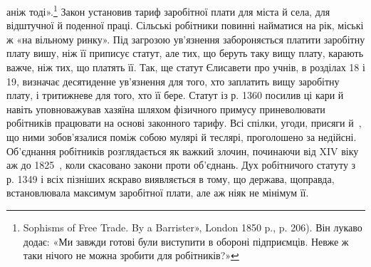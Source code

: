 \parcont{}  %
аніж тоді».\footnote{
Sophisms of Free Trade. By a Barrister», London 1850 p., p. 206).
Він лукаво додає: «Ми завжди готові були виступити в обороні підприємців.
Невже ж таки нічого не можна зробити для робітників?»
} Закон установив тариф заробітної плати для міста
й села, для відштучної й поденної праці. Сільські робітники
повинні найматися на рік, міські ж «на вільному ринку». Під
загрозою ув’язнення забороняється платити заробітну плату
вишу, ніж її приписує статут, але тих, що беруть таку вищу
плату, карають важче, ніж тих, що платять її. Так, ще статут
Єлисавети про учнів, в розділах 18 і 19, визначає десятиденне
ув’язнення для того, хто заплатить вищу заробітну плату, і
тритижневе для того, хто її бере. Статут із р. 1360 посилив ці
кари й навіть уповноважував хазяїна шляхом фізичного примусу
приневолювати робітників працювати на основі законного тарифу.
Всі спілки, угоди, присяги й~, що ними зобов’язалися поміж
собою мулярі й теслярі, проголошено за недійсні. Об’єднання
робітників розглядається як важкий злочин, починаючи від
XIV віку аж до 1825~, коли скасовано закони проти об’єднань.
Дух робітничого статуту з р. 1349 і всіх пізніших яскраво виявляється
в тому, що держава, щоправда, встановлювала максимум
заробітної плати, але аж ніяк не мінімум її.

